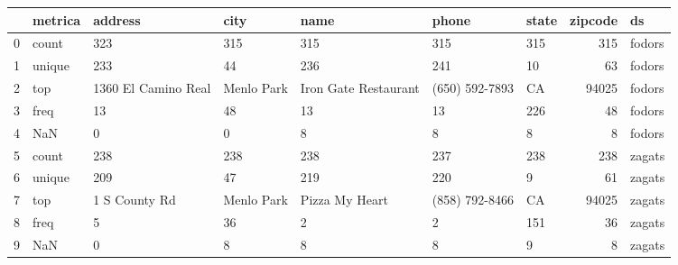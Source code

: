 \begin{tabular}{lllllllrl}
\toprule
{} & metrica &              address &        city &                  name &           phone & state &  zipcode &      ds \\
\midrule
0 &   count &                  323 &         315 &                   315 &             315 &   315 &      315 &  fodors \\
1 &  unique &                  233 &          44 &                   236 &             241 &    10 &       63 &  fodors \\
2 &     top &  1360 El Camino Real &  Menlo Park &  Iron Gate Restaurant &  (650) 592-7893 &    CA &    94025 &  fodors \\
3 &    freq &                   13 &          48 &                    13 &              13 &   226 &       48 &  fodors \\
4 &     NaN &                    0 &           0 &                     8 &               8 &     8 &        8 &  fodors \\
5 &   count &                  238 &         238 &                   238 &             237 &   238 &      238 &  zagats \\
6 &  unique &                  209 &          47 &                   219 &             220 &     9 &       61 &  zagats \\
7 &     top &        1 S County Rd &  Menlo Park &        Pizza My Heart &  (858) 792-8466 &    CA &    94025 &  zagats \\
8 &    freq &                    5 &          36 &                     2 &               2 &   151 &       36 &  zagats \\
9 &     NaN &                    0 &           8 &                     8 &               8 &     9 &        8 &  zagats \\
\bottomrule
\end{tabular}

